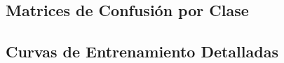 \documentclass[12pt,a4paper]{article}
\begin{document}
\subsection{Matrices de Confusión por Clase}


\subsection{Curvas de Entrenamiento Detalladas}


\end{document}
